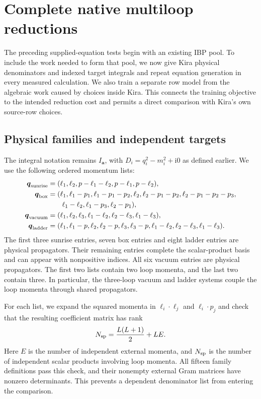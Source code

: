 \section{Complete native multiloop reductions}
\label{sec:complete-multiloop}
The preceding supplied-equation tests begin with an existing IBP pool.
To include the work needed to form that pool, we now give Kira physical
denominators and indexed target integrals and repeat equation generation
in every measured calculation. We also train a separate row model from
the algebraic work caused by choices inside Kira. This connects the
training objective to the intended reduction cost and permits a direct
comparison with Kira's own source-row choices.

\subsection{Physical families and independent targets}
The integral notation remains $I_{\boldsymbol a}$, with
$D_i=q_i^2-m_i^2+\mathrm{i}0$ as defined earlier. We use the following
ordered momentum lists:
\begin{align}
 \boldsymbol q_{\rm sunrise}
 &= (\ell_1,\ell_2,p-\ell_1-\ell_2,p-\ell_1,p-\ell_2),\\
 \boldsymbol q_{\rm box}
 &= (\ell_1,\ell_1-p_1,\ell_1-p_1-p_2,
     \ell_2,\ell_2-p_1-p_2,\ell_2-p_1-p_2-p_3,\nonumber\\
 &\hspace{2em}\ell_1-\ell_2,\ell_1-p_3,\ell_2-p_1),\\
 \boldsymbol q_{\rm vacuum}
 &= (\ell_1,\ell_2,\ell_3,\ell_1-\ell_2,
     \ell_2-\ell_3,\ell_1-\ell_3),\\
 \boldsymbol q_{\rm ladder}
 &= (\ell_1,\ell_1-p,\ell_2,\ell_2-p,\ell_3,\ell_3-p,
     \ell_1-\ell_2,\ell_2-\ell_3,\ell_1-\ell_3).
\end{align}
The first three sunrise entries, seven box entries and eight ladder
entries are physical propagators. Their remaining entries complete the
scalar-product basis and can appear with nonpositive indices. All six
vacuum entries are physical propagators. The first two lists contain
two loop momenta, and the last two contain three. In particular, the
three-loop vacuum and ladder systems couple the loop momenta through
shared propagators.

For each list, we expand the squared momenta in
$\ell_i\cdot\ell_j$ and $\ell_i\cdot p_j$ and check that the resulting
coefficient matrix has rank
\[
 N_{\rm sp}=\frac{L(L+1)}{2}+LE.
\]
Here $E$ is the number of independent external momenta, and $N_{\rm sp}$
is the number of independent scalar products involving loop momenta.
All fifteen family definitions pass this check, and their nonempty
external Gram matrices have nonzero determinants. This prevents a
dependent denominator list from entering the comparison.


